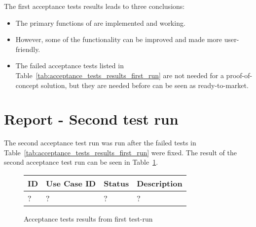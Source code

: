 The first acceptance tests results leads to three conclusions:

\begin{itemize}
	\item The primary functions of \projectname{} are implemented and working. 
	\item However, some of the functionality can be improved and made more user-friendly. 
	\item The failed acceptance tests listed in Table~\ref{tab:acceptance_tests_results_first_run} are not needed for a proof-of-concept solution, but they are needed before \projectname{} can be seen as ready-to-market.
\end{itemize}


\section{Report - Second test run}
The second acceptance test run was run after the failed tests in Table~\ref{tab:acceptance_tests_results_first_run} were fixed. 
The result of the second acceptance test run can be seen in Table~\ref{tab:acceptance_tests_results_second_run}. \\

\begin{figure}[htb]
\begin{center}
\begin{tabular}{ | l | l | l | p{8cm} | }
  \hline
	\textbf{ID} & \textbf{Use Case ID} & \textbf{Status} & \textbf{Description} \\ \hline
	? & ? & ? & ? \\ \hline
  \hline
\end{tabular}
\caption{Acceptance tests results from first test-run}
\label{tab:acceptance_tests_results_second_run}
\end{center}
\end{figure}

